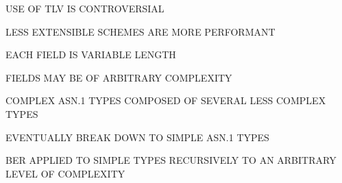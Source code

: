 \begin{bwslide}

\begin{nrtc}
\item	USE OF TLV IS CONTROVERSIAL
\item	LESS EXTENSIBLE SCHEMES ARE MORE PERFORMANT
\item	EACH FIELD IS VARIABLE LENGTH
\item	FIELDS MAY BE OF ARBITRARY COMPLEXITY
\end{nrtc}
\end{bwslide}




\begin{bwslide}

\begin{nrtc}
\item	COMPLEX ASN.1 TYPES COMPOSED OF SEVERAL LESS COMPLEX TYPES
\item	EVENTUALLY BREAK DOWN TO SIMPLE ASN.1 TYPES
\item	BER APPLIED TO SIMPLE TYPES RECURSIVELY TO AN ARBITRARY 
		LEVEL OF COMPLEXITY
\end{nrtc}
\end{bwslide}


%


